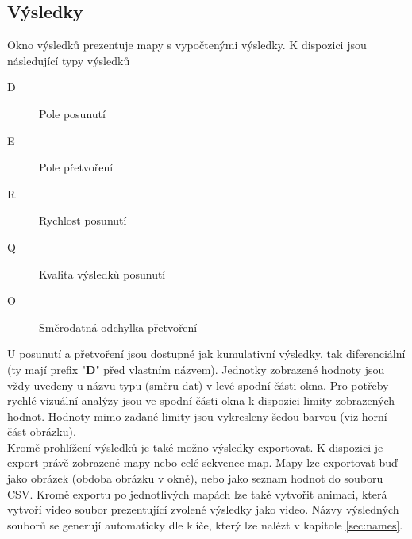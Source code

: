 \documentclass[a4paper,12pt]{article}
\begin{document}
\subsection{Výsledky}
\begin{figure}[H]
\end{figure}
Okno výsledků prezentuje mapy s vypočtenými výsledky. K dispozici jsou následující typy výsledků 
\begin{description}
\item[D]{Pole posunutí}
\item[E]{Pole přetvoření}
\item[R]{Rychlost posunutí}
\item[Q]{Kvalita výsledků posunutí}
\item[O]{Směrodatná odchylka přetvoření}
\end{description}
U posunutí a přetvoření jsou dostupné jak kumulativní výsledky, tak diferenciální (ty mají prefix "\textbf{D\textunderscore}" před vlastním názvem). Jednotky zobrazené hodnoty jsou vždy uvedeny u názvu typu (směru dat) v levé spodní části okna. Pro potřeby rychlé vizuální analýzy jsou ve spodní části okna k dispozici limity zobrazených hodnot. Hodnoty mimo zadané limity jsou vykresleny šedou barvou (viz horní část obrázku).\\
Kromě prohlížení výsledků je také možno výsledky exportovat. K dispozici je export právě zobrazené mapy nebo celé sekvence map. Mapy lze exportovat buď jako obrázek (obdoba obrázku v okně), nebo jako seznam hodnot do souboru CSV. Kromě exportu po jednotlivých mapách lze také vytvořit animaci, která vytvoří video soubor prezentující zvolené výsledky jako video. Názvy výsledných souborů se generují automaticky dle klíče, který lze nalézt v kapitole \ref{sec:names}.
\begin{figure}[H]
\end{figure}
\end{document}
